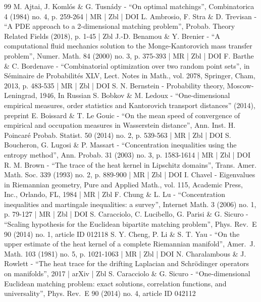 \begin{thebibliography}{99}
M. Ajtai, J. Komlós \& G. Tusnády - “On optimal matchings”, Combinatorica 4 (1984) no. 4, p. 259-264 | MR | Zbl | DOI
L. Ambrosio, F. Stra \& D. Trevisan - “A PDE approach to a 2-dimensional matching problem”, Probab. Theory Related Fields (2018), p. 1-45 | Zbl
J.-D. Benamou \& Y. Brenier - “A computational fluid mechanics solution to the Monge-Kantorovich mass transfer problem”, Numer. Math. 84 (2000) no. 3, p. 375-393 | MR | Zbl | DOI
F. Barthe \& C. Bordenave - “Combinatorial optimization over two random point sets”, in Séminaire de Probabilités XLV, Lect. Notes in Math., vol. 2078, Springer, Cham, 2013, p. 483-535 | MR | Zbl | DOI
S. N. Bernstein - Probability theory, Moscow-Leningrad, 1946, In Russian
S. Bobkov \& M. Ledoux - “One-dimensional empirical measures, order statistics and Kantorovich transport distances” (2014), preprint
E. Boissard \& T. Le Gouic - “On the mean speed of convergence of empirical and occupation measures in Wasserstein distance”, Ann. Inst. H. Poincaré Probab. Statist. 50 (2014) no. 2, p. 539-563 | MR | Zbl | DOI
S. Boucheron, G. Lugosi \& P. Massart - “Concentration inequalities using the entropy method”, Ann. Probab. 31 (2003) no. 3, p. 1583-1614 | MR | Zbl | DOI
R. M. Brown - “The trace of the heat kernel in Lipschitz domains”, Trans. Amer. Math. Soc. 339 (1993) no. 2, p. 889-900 | MR | Zbl | DOI
I. Chavel - Eigenvalues in Riemannian geometry, Pure and Applied Math., vol. 115, Academic Press, Inc., Orlando, FL, 1984 | MR | Zbl
F. Chung \& L. Lu - “Concentration inequalities and martingale inequalities: a survey”, Internet Math. 3 (2006) no. 1, p. 79-127 | MR | Zbl | DOI
S. Caracciolo, C. Lucibello, G. Parisi \& G. Sicuro - “Scaling hypothesis for the Euclidean bipartite matching problem”, Phys. Rev. E 90 (2014) no. 1, article ID 012118
S. Y. Cheng, P. Li \& S. T. Yau - “On the upper estimate of the heat kernel of a complete Riemannian manifold”, Amer. J. Math. 103 (1981) no. 5, p. 1021-1063 | MR | Zbl | DOI
N. Charalambous \& J. Rowlett - “The heat trace for the drifting Laplacian and Schrödinger operators on manifolds”, 2017 | arXiv | Zbl
S. Caracciolo \& G. Sicuro - “One-dimensional Euclidean matching problem: exact solutions, correlation functions, and universality”, Phys. Rev. E 90 (2014) no. 4, article ID 042112

\end{thebibliography}

